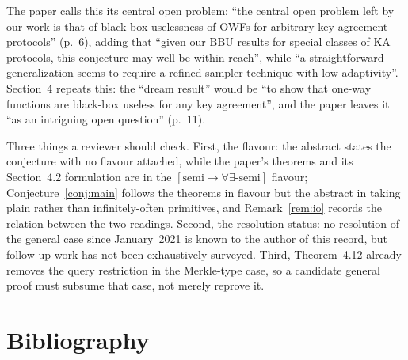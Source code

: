 \documentclass{conjura-conjecture}
\newcommand{\semibbu}{[\mathrm{semi}\to\forall\exists\text{-semi}]}
\begin{document}
\begin{remark}[openness]\label{rem:open}
The paper calls this its central open problem: ``the central open problem
left by our work is that of black-box uselessness of OWFs for arbitrary
key agreement protocols'' (p.~6), adding that ``given our BBU results for
special classes of KA protocols, this conjecture may well be within
reach'', while ``a straightforward generalization seems to require a
refined sampler technique with low adaptivity''. Section~4 repeats this:
the ``dream result'' would be ``to show that one-way functions are
black-box useless for any key agreement'', and the paper leaves it ``as
an intriguing open question'' (p.~11).
\end{remark}

\begin{remark}\label{rem:caveats}
Three things a reviewer should check. First, the flavour: the abstract
states the conjecture with no flavour attached, while the paper's
theorems and its Section~4.2 formulation are in the $\semibbu$ flavour;
Conjecture~\ref{conj:main} follows the theorems in flavour but the
abstract in taking plain rather than infinitely-often primitives, and
Remark~\ref{rem:io} records the relation between the two readings.
Second, the resolution status: no resolution of the general case since
January~2021 is known to the author of this record, but follow-up work
has not been exhaustively surveyed. Third, Theorem~4.12 already removes
the query restriction in the Merkle-type case, so a candidate general
proof must subsume that case, not merely reprove it.
\end{remark}

\section{Bibliography}
\end{document}
